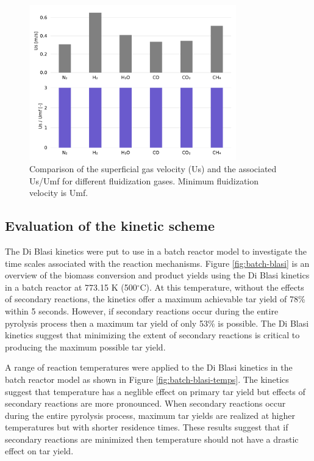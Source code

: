 \begin{figure}[H]
    \centering
    \includegraphics[width=0.8\textwidth]{figures/us-usumf-gases.pdf}
    \caption{Comparison of the superficial gas velocity (Us) and the associated Us/Umf for different fluidization gases. Minimum fluidization velocity is Umf.}
    \label{fig:us-usumf-gases}
\end{figure}


\subsection{Evaluation of the kinetic scheme}

The Di Blasi kinetics were put to use in a batch reactor model to investigate the time scales associated with the reaction mechanisms. Figure \ref{fig:batch-blasi} is an overview of the biomass conversion and product yields using the Di Blasi kinetics in a batch reactor at 773.15 K (500$^\circ$C). At this temperature, without the effects of secondary reactions, the kinetics offer a maximum achievable tar yield of 78\% within 5 seconds. However, if secondary reactions occur during the entire pyrolysis process then a maximum tar yield of only 53\% is possible. The Di Blasi kinetics suggest that minimizing the extent of secondary reactions is critical to producing the maximum possible tar yield.

A range of reaction temperatures were applied to the Di Blasi kinetics in the batch reactor model as shown in Figure \ref{fig:batch-blasi-temps}. The kinetics suggest that temperature has a neglible effect on primary tar yield but effects of secondary reactions are more pronounced. When secondary reactions occur during the entire pyrolysis process, maximum tar yields are realized at higher temperatures but with shorter residence times. These results suggest that if secondary reactions are minimized then temperature should not have a drastic effect on tar yield.

